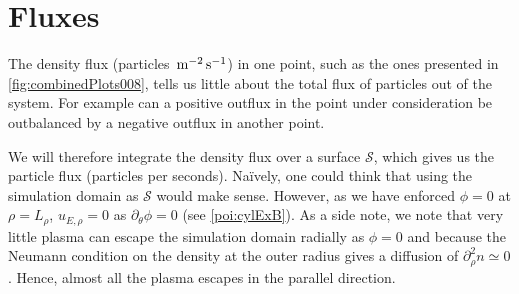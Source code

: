 \section{Fluxes}
\label{sec:fluxes}
%
The density flux (particles $\, \text{m}^{-2}\, \text{s}^{-1}$) in one point, such as the ones presented in \cref{fig:combinedPlots008}, tells us little about the total flux of particles out of the system.
For example can a positive outflux in the point under consideration be outbalanced by a negative outflux in another point.

We will therefore integrate the density flux over a surface $\mathcal{S}$, which gives us the particle flux (particles per seconds).
Na{\"i}vely, one could think that using the simulation domain as $\mathcal{S}$ would make sense.
However, as we have enforced $\phi=0$ at $\rho=L_\rho$, $u_{E,\rho}=0$ as $\partial_\theta \phi=0$ (see \cref{poi:cylExB}).
As a side note, we note that very little plasma can escape the simulation domain radially as $\phi=0$ and because the Neumann condition on the density at the outer radius gives a diffusion of $\partial_\rho^2 n \simeq 0$.
Hence, almost all the plasma escapes in the parallel direction.

